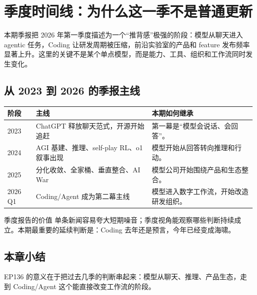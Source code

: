 \section{季度时间线：为什么这一季不是普通更新}

本期季报把 2026 年第一季度描述为一个“推背感”极强的阶段：模型从聊天进入 agentic 任务，Coding 让研发周期被压缩，前沿实验室的产品和 feature 发布频率显著上升。这里的关键不是某个单点模型，而是能力、工具、组织和工作流同时发生变化。

\subsection{从 2023 到 2026 的季报主线}

\noindent\begin{longtable}{p{}p{}p{}}
\toprule
阶段 & 主线 & 本期如何继承 \\
\midrule
2023 & ChatGPT 释放聊天范式，开源开始追赶 & 第一幕是“模型会说话、会回答”。 \\
2024 & AGI 基建、推理、self-play RL、o1 叙事出现 & 模型开始从回答转向推理和行动。 \\
2025 & 分化收敛、全家桶、垂直整合、AI War & 模型公司开始围绕产品和生态整合。 \\
2026 Q1 & Coding/Agent 成为第二幕主线 & 模型进入数字工作流，开始改造研发组织。 \\
\bottomrule
\end{longtable}

\begin{importantbox}{季度报告的价值}
单条新闻容易夸大短期噪音；季度视角能观察哪些判断持续成立。本期最重要的延续判断是：Coding 去年还是预言，今年已经变成海啸。
\end{importantbox}

\subsection{本章小结}

EP136 的意义在于把过去几季的判断串起来：模型从聊天、推理、产品生态，走到 Coding/Agent 这个能直接改变工作流的阶段。

